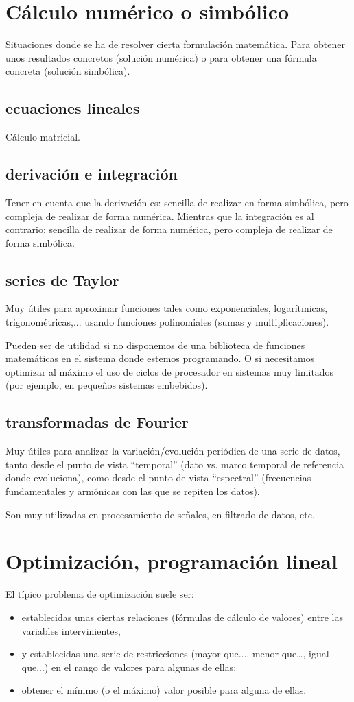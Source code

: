 \documentclass[spanish,12pt,a4paper,final,oneside]{book}
\begin{document}
\section{Cálculo numérico o simbólico}
Situaciones donde se ha de resolver cierta formulación matemática. Para obtener unos resultados concretos (solución numérica) o para obtener una fórmula concreta (solución simbólica).

\subsection{ecuaciones lineales}
Cálculo matricial.

\subsection{derivación e integración}
Tener en cuenta que la derivación es: sencilla de realizar en forma simbólica, pero compleja de realizar de forma numérica. Mientras que la integración es al contrario: sencilla de realizar de forma numérica, pero compleja de realizar de forma simbólica.

\subsection{series de Taylor}
Muy útiles para aproximar funciones tales como exponenciales, logarítmicas, trigonométricas,... usando funciones polinomiales (sumas y multiplicaciones).

Pueden ser de utilidad si no disponemos de una biblioteca de funciones matemáticas en el sistema donde estemos programando. O si necesitamos optimizar al máximo el uso de ciclos de procesador en sistemas muy limitados (por ejemplo, en pequeños sistemas embebidos).

\subsection{transformadas de Fourier}
Muy útiles para analizar la variación/evolución periódica de una serie de datos, tanto desde el punto de vista ``temporal'' (dato vs. marco temporal de referencia donde evoluciona), como desde el punto de vista ``espectral'' (frecuencias fundamentales y armónicas con las que se repiten los datos).

Son muy utilizadas en procesamiento de señales, en filtrado de datos, etc.

\section{Optimización, programación lineal}
El típico problema de optimización suele ser: 
\begin{itemize}
\item establecidas unas ciertas relaciones (fórmulas de cálculo de valores) entre las variables intervinientes, 
\item y establecidas una serie de restricciones (mayor que..., menor que…, igual que...) en el rango de valores para algunas de ellas; 
\item obtener el mínimo (o el máximo) valor posible para alguna de ellas.
\end{itemize}
\end{document}
